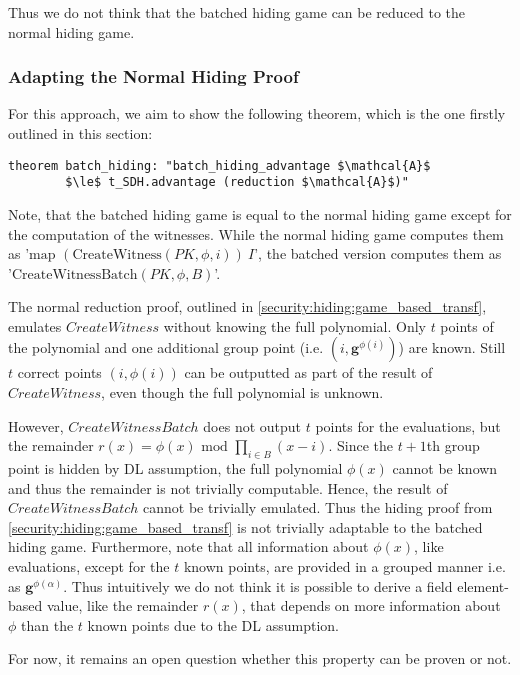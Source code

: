 Thus we do not think that the batched hiding game can be reduced to the normal hiding game.

\subsubsection*{Adapting the Normal Hiding Proof}
For this approach, we aim to show the following theorem, which is the one firstly outlined in this section: 
\begin{lstlisting}[language=isabelle]
    theorem batch_hiding: "batch_hiding_advantage $\mathcal{A}$ 
        $\le$ t_SDH.advantage (reduction $\mathcal{A}$)"
\end{lstlisting}

Note, that the batched hiding game is equal to the normal hiding game except for the computation of the witnesses. While the normal hiding game computes them as 
'$\text{map } (\text{CreateWitness}(PK,\phi,i))\ I$', the batched version computes them as \\
'$\text{CreateWitnessBatch}(PK,\phi,B)$'. 

The normal reduction proof, outlined in \ref*{security:hiding:game_based_transf}, emulates $CreateWitness$ without knowing the full polynomial. Only $t$ points of the polynomial and one additional group point (i.e. $(i,\mathbf{g}^{\phi(i)})$) are known. Still $t$ correct points $(i,\phi(i))$ can be outputted as part of the result of $CreateWitness$, even though the full polynomial is unknown.

However, $CreateWitnessBatch$ does not output $t$ points for the evaluations, but the remainder $r(x)=\phi(x) \text{ mod } \prod_{i \in B}^{}(x-i)$. Since the $t+1$th group point is hidden by DL assumption, the full polynomial $\phi(x)$ cannot be known and thus the remainder is not trivially computable. Hence, the result of $CreateWitnessBatch$ cannot be trivially emulated. Thus the hiding proof from \ref*{security:hiding:game_based_transf} is not trivially adaptable to the batched hiding game.
Furthermore, note that all information about $\phi(x)$, like evaluations, except for the $t$ known points, are provided in a grouped manner i.e. as $\mathbf{g}^{\phi(\alpha)}$. Thus intuitively we do not think it is possible to derive a field element-based value, like the remainder $r(x)$, that depends on more information about $\phi$ than the $t$ known points due to the DL assumption.

For now, it remains an open question whether this property can be proven or not.


